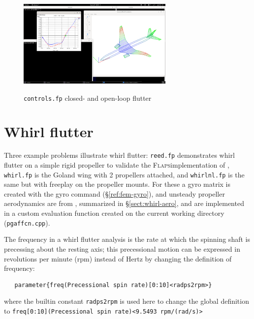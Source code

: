 \documentclass[11pt,openany,twoside]{book}
\numberwithin{equation}{section}		%
\newcommand{\Cmd}[1]{{\sf #1}}
\newcommand{\Code}[1]{{\small\tt #1}}
\newcommand{\Flaps}{\textsc{Flaps\:}}
\newcommand{\Sectref}[1]{\S\ref{#1}}
\newcommand{\Figref}[1]{Fig. \ref{#1}}  %
\begin{document}
\begin{figure}[ht]
		\includegraphics[height=2in,width=3.0in]{controls_vso.png}
	\centering
	\caption{\Code{controls.fp} closed- and open-loop flutter}\label{fig:controls_vso}
\end{figure}

\newpage
\section{Whirl flutter}\label{ex:whirl}
Three example problems illustrate whirl flutter:
\Code{reed.fp} demonstrates whirl flutter on a simple rigid propeller
to validate the \Flaps implementation of \cite{reed1961analytical},
\Code{whirl.fp} is the Goland wing with 2
propellers attached, and \Code{whirlnl.fp} is the same but with freeplay
on the propeller mounts. For these a gyro matrix is created with the \Cmd{gyro}
command (\Sectref{ref:fem-gyro}), and
unsteady propeller aerodynamics are from \cite{reed1961analytical},
summarized in \Sectref{sect:whirl-aero}, and are implemented
in a custom evaluation function created on the current working directory
(\Code{pgaffcn.cpp}).

The frequency in a whirl flutter analysis is the rate
at which the spinning shaft is precessing about the resting
axis; this precessional motion can be expressed in revolutions
per minute (rpm) instead of Hertz by changing the definition
of frequency:
\begin{lstlisting}
   parameter{freq(Precessional spin rate)[0:10]<radps2rpm>}
\end{lstlisting}
where the builtin constant \Code{radps2rpm} is used here to
change the global definition to
\Code{freq[0:10](Precessional spin rate)<9.5493 rpm/(rad/s)>}
\end{document}
